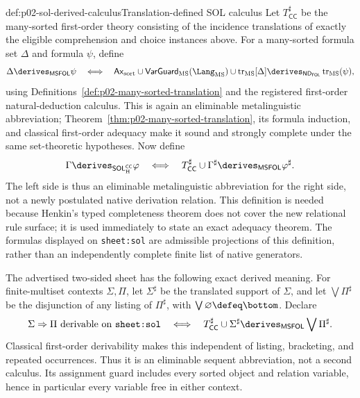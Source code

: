 \begin{hbdefinition}{def:p02-sol-derived-calculus}{Translation-defined SOL calculus}
Let \(T_{\mathsf{CC}}^\sharp\) be the many-sorted first-order theory
consisting of the incidence translations of exactly the eligible
comprehension and choice instances above.  For a many-sorted formula set
\(\Delta\) and formula \(\psi\), define
\[
 \Delta\derives_{\mathsf{MSFOL}}\psi
 \quad\Longleftrightarrow\quad
 \mathsf{Ax}_{\mathrm{sort}}\cup
 \mathsf{VarGuard}_{\mathrm{MS}}(\Lang_{\mathrm{MS}})\cup
 \operatorname{tr}_{\mathrm{MS}}[\Delta]
 \derives_{\mathsf{ND}_{\mathsf{FOL}}}
 \operatorname{tr}_{\mathrm{MS}}(\psi),
\]
using Definitions~\ref{def:p02-many-sorted-translation} and the registered
first-order natural-deduction calculus.  This is again an eliminable
metalinguistic abbreviation; Theorem~\ref{thm:p02-many-sorted-translation},
its formula induction, and classical first-order adequacy make it sound and
strongly complete under the same set-theoretic hypotheses.  Now define
\[
 \Gamma\derives_{\mathsf{SOL}_{\mathrm H}^{\mathsf{CC}}}\varphi
 \quad\Longleftrightarrow\quad
 T_{\mathsf{CC}}^\sharp\cup\Gamma^\sharp
 \derives_{\mathsf{MSFOL}}\varphi^\sharp.
\]
The left side is thus an eliminable metalinguistic abbreviation for the right
side, not a newly postulated native derivation relation.  This definition is
needed because Henkin's typed completeness theorem does not cover the new
relational rule surface; it is used immediately to state an exact adequacy
theorem.  The formulas displayed on \texttt{sheet:sol} are admissible
projections of this definition, rather than an independently complete finite
list of native generators.

The advertised two-sided sheet has the following exact derived meaning.  For
finite-multiset contexts \(\Sigma,\Pi\), let \(\Sigma^\sharp\) be the
translated support of \(\Sigma\), and let \(\bigvee\Pi^\sharp\) be the
disjunction of any listing of \(\Pi^\sharp\), with
\(\bigvee\varnothing\defeq\bottom\).  Declare
\[
 \Sigma\Rightarrow\Pi\text{ derivable on \texttt{sheet:sol}}
 \quad\Longleftrightarrow\quad
 T_{\mathsf{CC}}^\sharp\cup\Sigma^\sharp
 \derives_{\mathsf{MSFOL}}\bigvee\Pi^\sharp.
\]
Classical first-order derivability makes this independent of listing,
bracketing, and repeated occurrences.  Thus it is an eliminable sequent
abbreviation, not a second calculus.  Its assignment guard includes every
sorted object and relation variable, hence in particular every variable free
in either context.
\end{hbdefinition}

